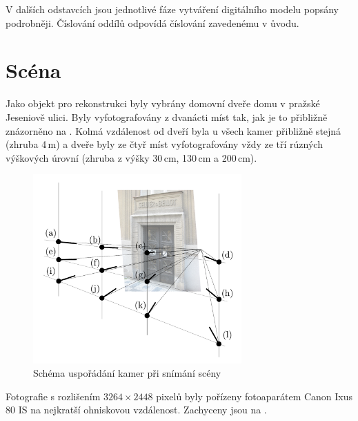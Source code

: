 \documentclass[11pt,oneside,a4paper,pdftex]{article}   %
\begin{document}
	V dalších odstavcích jsou jednotlivé fáze vytváření digitálního modelu popsány podrobněji. Číslování
	oddílů odpovídá číslování zavedenému v ůvodu.


\section{Scéna}

	Jako objekt pro rekonstrukci byly vybrány domovní dveře domu v pražské Jeseniově ulici. Byly
	vyfotografovány z dvanácti míst tak, jak je to přibližně znázorněno na .
	Kolmá vzdálenost od dveří byla u všech kamer přibližně stejná (zhruba 4\,m) a dveře byly ze čtyř
	míst vyfotografovány vždy ze tří rúzných výškových úrovní (zhruba z výšky 30\,cm, 130\,cm a
	200\,cm).
		\begin{figure}[htb]
			\centering
			\includegraphics[width=8cm]{pictures/usporadani_kamer.pdf}
			\caption{Schéma uspořádání kamer při snímání scény}
			\label{figUsporadaniKamer}
		\end{figure}
	Fotografie s rozlišením $3264\times2448$ pixelů byly pořízeny fotoaparátem Canon Ixus 80
	IS na nejkratší ohniskovou vzdálenost. Zachyceny jsou na .
\end{document}
